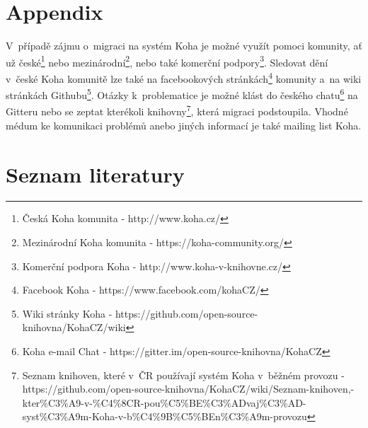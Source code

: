 \documentclass[
	11pt, oneside, printed, final, palatino, monochrome
	microtype,
	table,   %
	lof,     %
	lot     %
]{fithesis3}
\begin{document}
{\chapter*{Appendix}
V~případě zájmu o~migraci na systém Koha je možné využít pomoci komunity, ať už české\footnote{Česká Koha komunita - http://www.koha.cz/} nebo mezinárodní\footnote{Mezinárodní Koha komunita - https://koha-community.org/
}, nebo také komerční podpory\footnote{Komerční podpora Koha - http://www.koha-v-knihovne.cz/}.
Sledovat dění v~české Koha komunitě lze také na facebookových stránkách\footnote{Facebook Koha - https://www.facebook.com/kohaCZ/
} komunity a~na wiki stránkách Githubu\footnote{Wiki stránky Koha -  https://github.com/open-source-knihovna/KohaCZ/wiki
}. Otázky k~problematice je možné klást do českého chatu\footnote{Koha e-mail Chat - https://gitter.im/open-source-knihovna/KohaCZ} na Gitteru nebo se zeptat kterékoli knihovny\footnote{Seznam knihoven, které v~ČR používají systém Koha v~běžném provozu - https://github.com/open-source-knihovna/KohaCZ/wiki/Seznam-knihoven,-kter\%C3\%A9-v-\%C4\%8CR-pou\%C5\%BE\%C3\%ADvaj\%C3\%AD-syst\%C3\%A9m-Koha-v-b\%C4\%9B\%C5\%BEn\%C3\%A9m-provozu
}, která migraci podstoupila. Vhodné médum ke komunikaci problémů anebo jiných informací je také mailing list Koha.

\chapter*{Seznam literatury}

}
\end{document}
